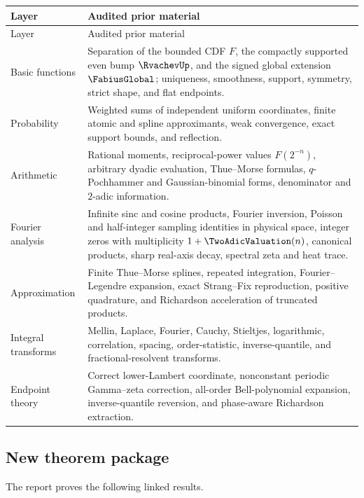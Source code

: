 \documentclass[11pt]{article}
\theoremstyle{definition}
\theoremstyle{remark}
\begin{document}
\begin{longtable}{@{}p{}p{}@{}}
\toprule
Layer & Audited prior material \\
\midrule
\endfirsthead
\toprule
Layer & Audited prior material \\
\midrule
\endhead
Basic functions & Separation of the bounded CDF $F$, the compactly supported even bump $\RvachevUp$, and the signed global extension $\FabiusGlobal$; uniqueness, smoothness, support, symmetry, strict shape, and flat endpoints.\\
Probability & Weighted sums of independent uniform coordinates, finite atomic and spline approximants, weak convergence, exact support bounds, and reflection.\\
Arithmetic & Rational moments, reciprocal-power values $F(2^{-n})$, arbitrary dyadic evaluation, Thue--Morse formulas, $q$-Pochhammer and Gaussian-binomial forms, denominator and $2$-adic information.\\
Fourier analysis & Infinite sinc and cosine products, Fourier inversion, Poisson and half-integer sampling identities in physical space, integer zeros with multiplicity $1+\TwoAdicValuation(n)$, canonical products, sharp real-axis decay, spectral zeta and heat trace.\\
Approximation & Finite Thue--Morse splines, repeated integration, Fourier--Legendre expansion, exact Strang--Fix reproduction, positive quadrature, and Richardson acceleration of truncated products.\\
Integral transforms & Mellin, Laplace, Fourier, Cauchy, Stieltjes, logarithmic, correlation, spacing, order-statistic, inverse-quantile, and fractional-resolvent transforms.\\
Endpoint theory & Correct lower-Lambert coordinate, nonconstant periodic Gamma--zeta correction, all-order Bell-polynomial expansion, inverse-quantile reversion, and phase-aware Richardson extraction.\\
\bottomrule
\end{longtable}

\subsection{New theorem package}

The report proves the following linked results.
\end{document}
